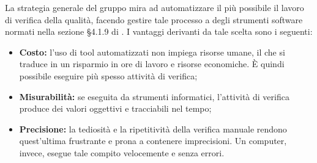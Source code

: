 La strategia generale del gruppo \gruppo \space mira ad automatizzare il più possibile il 
lavoro di verifica della qualità, facendo gestire tale processo a degli strumenti software 
normati nella sezione §4.1.9 di \NdP. \newline
I vantaggi derivanti da tale scelta sono i seguenti:
\begin{itemize}
    \item \textbf{Costo:} l'uso di {tool} automatizzati non impiega {risorse} umane, il che si traduce in un risparmio in ore di lavoro e risorse economiche.  \`E quindi possibile eseguire più spesso attività di verifica;
    \item \textbf{Misurabilità:} se eseguita da strumenti informatici, l'attività di verifica produce dei valori oggettivi e tracciabili nel tempo;
    \item \textbf{Precisione:} la tediosità e la ripetitività della verifica manuale rendono quest'ultima frustrante e prona a contenere imprecisioni. Un computer, invece, esegue tale compito velocemente e senza errori.
\end{itemize}
